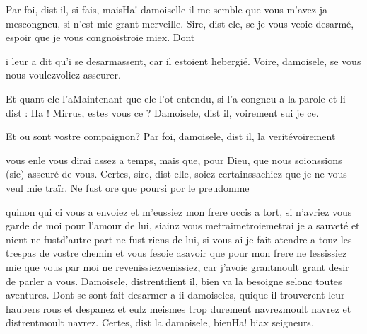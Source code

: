 \documentclass{article}
\begin{document}
\begin{pages}
                     Par foi, dist il, si fais, maisHa! damoiselle il me semble que vous m’avez 
                     ja mescongneu, si n’est mie grant merveille.
               Sire, dist ele, se je vous veoie desarmé, espoir que 
                     je vous congnoistroie miex. Dont 
                  
                  i leur a dit qu’i se desarmassent, car il
                  estoient hebergié. Voire, damoisele, se
                  vous nous 
                     voulezvoliez asseurer.
               
                  Et quant ele l’aMaintenant que ele l'ot entendu, si l’a congneu a la parole et li dist : Ha ! Mirrus, estes vous ce
                  ?
               Damoisele, dist il,
                  voirement sui je ce.
               
                     Et ou sont vostre compaignon?
               Par foi, damoisele, dist il, 
                     la veritévoirement
                  
                     vous enle vous dirai assez a temps, mais que, pour Dieu, que nous 
                     soionssions (sic) asseuré de vous.
               Certes, sire, dist elle, 
                     soiez certainssachiez que je ne vous veul mie traïr. Ne fust ore que 
                     poursi por
                  le preudomme
                  
                     quinon qui ci vous a envoiez et m’eussiez mon
                     frere occis a tort, si n’avriez vous garde de moi 
                     pour l’amour de lui, 
                     siainz vous 
                     metraimetroiemetrai je a sauveté et 
                     nient ne fustd'autre part ne fust riens de lui, si vous ai je fait atendre a touz les trespas de vostre chemin et
                  vous fesoie asavoir que pour mon frere ne
                  lessissiez mie que vous par moi ne 
                     revenissiezvenissiez, car j’avoie 
                     grantmoult grant desir de parler a vous.
               Damoisele, 
                     distrentdient il, bien va la besoigne selonc toutes aventures. Dont se sont fait
               desarmer a ii damoiseles, 
                  quique il trouverent leur haubers rous et despanez et eulz meismes 
                  trop durement navrezmoult navrez et distrentmoult navrez. 
                     Certes, dist la
                        damoisele, bienHa! biax seigneurs,
                  

\end{pages}
\end{document}

